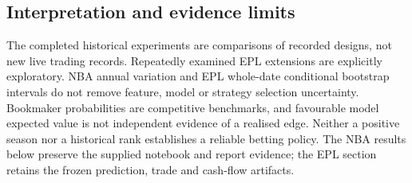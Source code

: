 \subsection{Interpretation and evidence limits}
The completed historical experiments are comparisons of recorded designs,
not new live trading records. Repeatedly examined EPL extensions are explicitly
exploratory. NBA annual variation and EPL whole-date conditional bootstrap
intervals do not remove feature, model or strategy selection uncertainty.
Bookmaker probabilities are competitive benchmarks, and favourable model
expected value is not independent evidence of a realised edge. Neither a
positive season nor a historical rank establishes a reliable betting policy.
The NBA results below preserve the supplied notebook and report evidence;
the EPL section retains the frozen prediction, trade and cash-flow artifacts.
